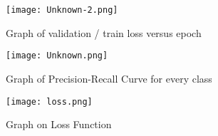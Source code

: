 \documentclass{article}
\begin{document}
\begin{figure}[bhtp]
	\texttt{[image: Unknown-2.png]}
	\caption{Graph of validation / train loss versus epoch}
	\label{fig:1}
\end{figure}


\begin{figure}[bhtp]
	\texttt{[image: Unknown.png]}
	\caption{Graph of Precision-Recall Curve for every class}
	\label{fig:2}
\end{figure}


\begin{figure}[bhtp]
	\texttt{[image: loss.png]}
	\caption{Graph on Loss Function}
	\label{fig:3}
\end{figure}





\end{document}
